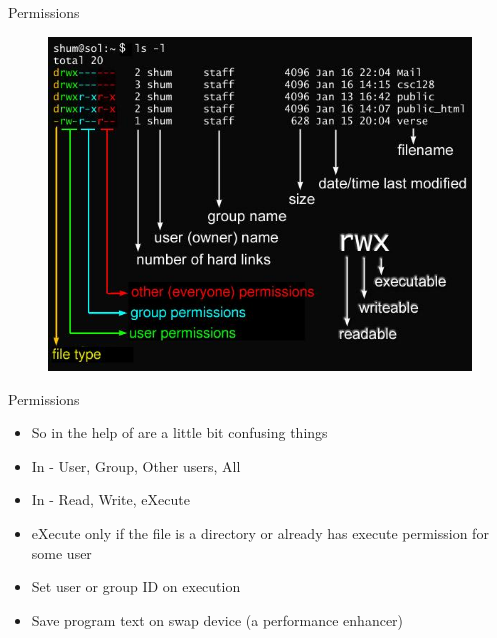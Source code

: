 \documentclass[usenames,dvipsnames,10pt,aspectratio=169]{beamer}
\begin{document}
\begin{frame}{Permissions}
    \begin{figure}
        \centering
        \includegraphics[height=0.8\paperheight]{graphics/permissions1.jpg}
\end{figure}
    
\end{frame}



\begin{frame}{Permissions}
    \begin{itemize}
        \item So in the help of  are a little bit confusing things
        \item In \ex{[ugoa]} - User, Group, Other users, All
        \item In \ex{[rwxXst]} - Read, Write, eXecute
        \item eXecute only if the file is a directory or already has execute permission for some user
        \item Set user or group ID on execution
        \item Save program text on swap device (a performance enhancer)
    \end{itemize}
\end{frame}
\end{document}
